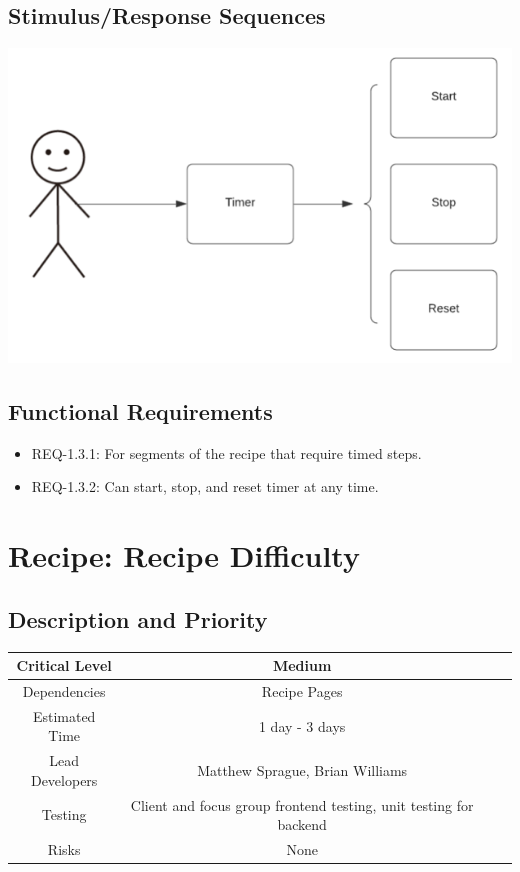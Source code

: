 \documentclass{scrreprt}
\begin{document}
\subsection{Stimulus/Response Sequences}

\includegraphics{FlowCharts/Recipe-Timer.png}

\subsection{Functional Requirements}

\begin{itemize}
    \item REQ-1.3.1: For segments of the recipe that require timed steps.
    \item REQ-1.3.2: Can start, stop, and reset timer at any time.
\end{itemize}

\section{Recipe: Recipe Difficulty}

\subsection{Description and Priority}
\begin{center}
    \begin{tabular}{| c | c | c | c |}
        \hline
        Critical Level & Medium \\
        \hline
        Dependencies & Recipe Pages \\
        \hline
        Estimated Time & 1 day - 3 days \\
        \hline
        Lead Developers & Matthew Sprague, Brian Williams \\
        \hline
        Testing & Client and focus group frontend testing, unit testing for backend \\
        \hline
        Risks & None \\
        \hline
    \end{tabular}
\end{center}
\end{document}
